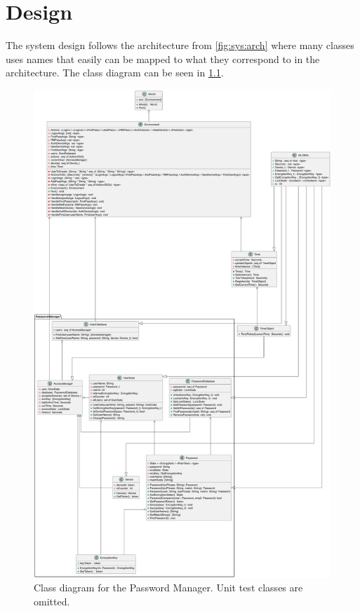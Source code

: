 \chapter{Design}

The system design follows the architecture from \cref{fig:sys:arch} where many
classes uses names that easily can be mapped to what they correspond to in the
architecture. The class diagram can be seen in \cref{fig:design:class}.

\begin{figure}[H]
    \centering
    \includegraphics[width=13cm]{prj/figs/ClassDiagram.pdf}
    \caption{Class diagram for the Password Manager. Unit test classes are omitted.}
    \label{fig:design:class}
\end{figure}


